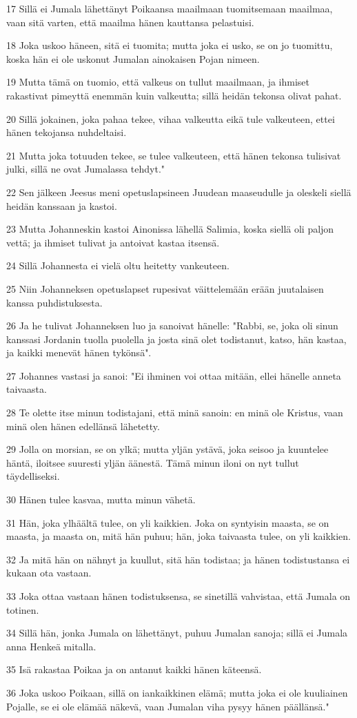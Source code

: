 \par 17 Sillä ei Jumala lähettänyt Poikaansa maailmaan tuomitsemaan maailmaa, vaan sitä varten, että maailma hänen kauttansa pelastuisi.
\par 18 Joka uskoo häneen, sitä ei tuomita; mutta joka ei usko, se on jo tuomittu, koska hän ei ole uskonut Jumalan ainokaisen Pojan nimeen.
\par 19 Mutta tämä on tuomio, että valkeus on tullut maailmaan, ja ihmiset rakastivat pimeyttä enemmän kuin valkeutta; sillä heidän tekonsa olivat pahat.
\par 20 Sillä jokainen, joka pahaa tekee, vihaa valkeutta eikä tule valkeuteen, ettei hänen tekojansa nuhdeltaisi.
\par 21 Mutta joka totuuden tekee, se tulee valkeuteen, että hänen tekonsa tulisivat julki, sillä ne ovat Jumalassa tehdyt."
\par 22 Sen jälkeen Jeesus meni opetuslapsineen Juudean maaseudulle ja oleskeli siellä heidän kanssaan ja kastoi.
\par 23 Mutta Johanneskin kastoi Ainonissa lähellä Salimia, koska siellä oli paljon vettä; ja ihmiset tulivat ja antoivat kastaa itsensä.
\par 24 Sillä Johannesta ei vielä oltu heitetty vankeuteen.
\par 25 Niin Johanneksen opetuslapset rupesivat väittelemään erään juutalaisen kanssa puhdistuksesta.
\par 26 Ja he tulivat Johanneksen luo ja sanoivat hänelle: "Rabbi, se, joka oli sinun kanssasi Jordanin tuolla puolella ja josta sinä olet todistanut, katso, hän kastaa, ja kaikki menevät hänen tykönsä".
\par 27 Johannes vastasi ja sanoi: "Ei ihminen voi ottaa mitään, ellei hänelle anneta taivaasta.
\par 28 Te olette itse minun todistajani, että minä sanoin: en minä ole Kristus, vaan minä olen hänen edellänsä lähetetty.
\par 29 Jolla on morsian, se on ylkä; mutta yljän ystävä, joka seisoo ja kuuntelee häntä, iloitsee suuresti yljän äänestä. Tämä minun iloni on nyt tullut täydelliseksi.
\par 30 Hänen tulee kasvaa, mutta minun vähetä.
\par 31 Hän, joka ylhäältä tulee, on yli kaikkien. Joka on syntyisin maasta, se on maasta, ja maasta on, mitä hän puhuu; hän, joka taivaasta tulee, on yli kaikkien.
\par 32 Ja mitä hän on nähnyt ja kuullut, sitä hän todistaa; ja hänen todistustansa ei kukaan ota vastaan.
\par 33 Joka ottaa vastaan hänen todistuksensa, se sinetillä vahvistaa, että Jumala on totinen.
\par 34 Sillä hän, jonka Jumala on lähettänyt, puhuu Jumalan sanoja; sillä ei Jumala anna Henkeä mitalla.
\par 35 Isä rakastaa Poikaa ja on antanut kaikki hänen käteensä.
\par 36 Joka uskoo Poikaan, sillä on iankaikkinen elämä; mutta joka ei ole kuuliainen Pojalle, se ei ole elämää näkevä, vaan Jumalan viha pysyy hänen päällänsä."

